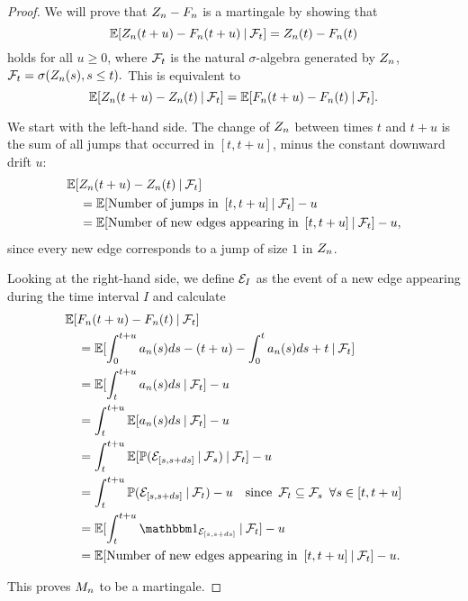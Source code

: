 \begin{proof} \label{P: decomp Zn}
	We will prove that $Z_n - F_n$ is a martingale by showing that
	\begin{equation} \label{E: Mn martingale}
	\mathbb{E}[ Z_n(t+u) - F_n(t+u) \: | \: \mathcal{F}_{t} ] = Z_n(t) - F_n(t)
	\end{equation}
	holds for all $u \geq 0$, where $\mathcal{F}_{t}$ is the natural $\sigma$-algebra generated by $Z_n$, 
	$\mathcal{F}_{t} = \sigma(Z_n(s), s \leq t).$
	This is equivalent to 
	\begin{equation}
	\mathbb{E}[Z_n(t+u) - Z_n(t) \: | \: \mathcal{F}_{t}] = \mathbb{E}[F_n(t+u) - F_n(t) \: | \: \mathcal{F}_{t}].
	\end{equation}
	
	We start with the left-hand side. 
	The change of $Z_n$ between times $t$ and $t+u$ is the sum of all jumps that occurred in $[t, t+u]$,
	minus the constant downward drift $u$:
	\begin{align*}
	&\mathbb{E}[Z_n(t+u) - Z_n(t) \: | \: \mathcal{F}_{t}] \\
	&\quad= \mathbb{E}[\text{Number of jumps in} \enspace [t, t+u] \: | \: \mathcal{F}_{t}] - u \\
	&\quad= \mathbb{E}[\text{Number of new edges appearing in} \enspace [t, t+u] \: | \: \mathcal{F}_{t}] - u,
	\end{align*}
	since every new edge corresponds to a jump of size $1$ in $Z_n$.
	
	Looking at the right-hand side, we define $\mathcal{E}_{I}$ as the event of a new edge appearing during the time interval $I$ and calculate
	\begin{align*}
	&\Exp{\An(t+u) - \An(t) \cond \F{t}} \\
	&\quad= \Exp{ \int_{0}^{t+u} a_n(s)ds - (t+u) - \int_{0}^{t} a_n(s)ds + t \cond \F{t} } \\
	&\quad= \Exp{ \int_{t}^{t+u} a_n(s)ds \cond \F{t} } - u \\
	&\quad= \int_{t}^{t+u} \Exp{a_n(s)ds \cond \F{t}} - u \\
	&\quad= \int_{t}^{t+u} \Exp{ \Prob(\NewEdge{\sds} \cond \F{s}) \cond \F{t} } - u\\
	&\quad= \int_{t}^{t+u} \Prob( \NewEdge{\sds} \cond \F{t} ) - u
	\quad \text{since} \enspace \F{t} \subseteq \F{s} \enspace \forall s \in [t,t+u] \\
	&\quad= \Exp{ \int_{t}^{t+u}  \Ind{\NewEdge{\sds}} \cond \F{t}} -u \\
	&\quad= \Exp{\text{Number of new edges appearing in} \enspace [t, t+u] \cond \F{t}} - u.
	\end{align*}
	
	
	This proves $M_n$ to be a martingale. 	
\end{proof}

